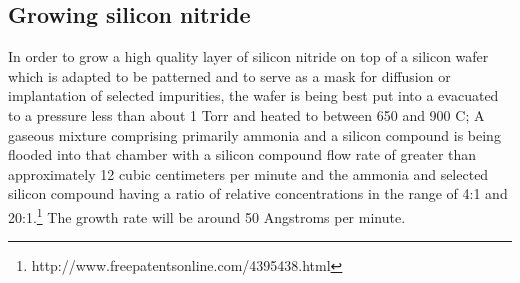 \subsection{Growing silicon nitride}\label{chemistry_growing_nitride}
In order to grow a high quality layer of silicon nitride on top of a silicon wafer which is adapted to be patterned and to serve as a mask for diffusion or implantation of selected impurities, the wafer is being best put into a evacuated to a pressure less than about 1 Torr and heated to between 650 and 900 \degree C;
A gaseous mixture comprising primarily ammonia and a silicon compound is being flooded into that chamber with a silicon compound flow rate of greater than approximately 12 cubic centimeters per minute and the ammonia and selected silicon compound having a ratio of relative concentrations in the range of 4:1 and 20:1.\footnote{http://www.freepatentsonline.com/4395438.html}
The growth rate will be around 50 Angstroms per minute.

